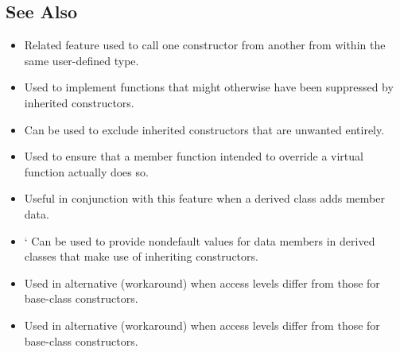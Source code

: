 \subsection[See Also]{See Also}\label{see-also}

\begin{itemize}
\item{%
Related feature used to call one constructor from another from within the same user-defined type.}
\item{%
Used to implement functions that might otherwise have been suppressed by inherited constructors.}
\item{%
Can be used to exclude inherited constructors that are unwanted entirely.}
\item{%
Used to ensure that a member function intended to override a virtual function actually does so.}
\item{%
Useful in conjunction with this feature when a derived class adds member data.}
\item{`%
Can be used to provide nondefault values for data members in derived classes that make use of inheriting constructors.}
\item{%
Used in alternative (workaround) when access levels differ from those for base-class constructors.}
\item{%
Used in alternative (workaround) when access levels differ from those for base-class constructors.}
\end{itemize}

